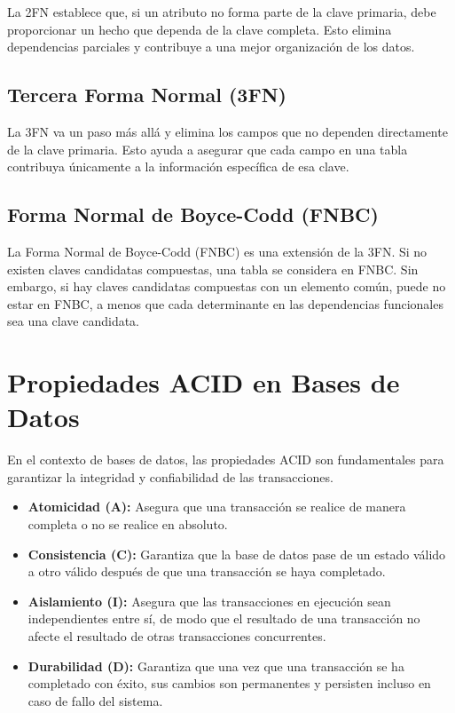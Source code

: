 La 2FN establece que, si un atributo no forma parte de la clave primaria, debe proporcionar un hecho que dependa de la clave completa. Esto elimina dependencias parciales y contribuye a una mejor organización de los datos.

\subsection{Tercera Forma Normal (3FN)}

La 3FN va un paso más allá y elimina los campos que no dependen directamente de la clave primaria. Esto ayuda a asegurar que cada campo en una tabla contribuya únicamente a la información específica de esa clave.

\subsection{Forma Normal de Boyce-Codd (FNBC)}

La Forma Normal de Boyce-Codd (FNBC) es una extensión de la 3FN. Si no existen claves candidatas compuestas, una tabla se considera en FNBC. Sin embargo, si hay claves candidatas compuestas con un elemento común, puede no estar en FNBC, a menos que cada determinante en las dependencias funcionales sea una clave candidata.

\section{Propiedades ACID en Bases de Datos}

En el contexto de bases de datos, las propiedades ACID son fundamentales para garantizar la integridad y confiabilidad de las transacciones.

\begin{itemize}
  \item \textbf{Atomicidad (A):} Asegura que una transacción se realice de manera completa o no se realice en absoluto.

  \item \textbf{Consistencia (C):} Garantiza que la base de datos pase de un estado válido a otro válido después de que una transacción se haya completado.

  \item \textbf{Aislamiento (I):} Asegura que las transacciones en ejecución sean independientes entre sí, de modo que el resultado de una transacción no afecte el resultado de otras transacciones concurrentes.

  \item \textbf{Durabilidad (D):} Garantiza que una vez que una transacción se ha completado con éxito, sus cambios son permanentes y persisten incluso en caso de fallo del sistema.
\end{itemize}
